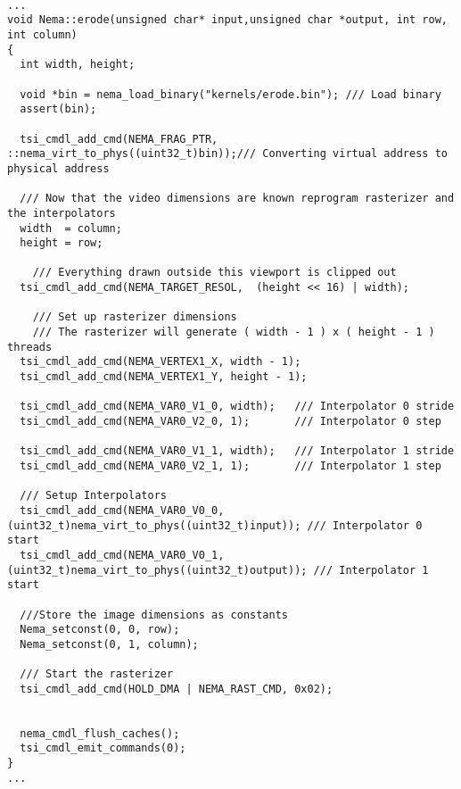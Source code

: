 \lstset {language=C++}
\begin{lstlisting}

...
void Nema::erode(unsigned char* input,unsigned char *output, int row, int column)
{
  int width, height;

  void *bin = nema_load_binary("kernels/erode.bin"); /// Load binary
  assert(bin);

  tsi_cmdl_add_cmd(NEMA_FRAG_PTR, ::nema_virt_to_phys((uint32_t)bin));/// Converting virtual address to physical address

  /// Now that the video dimensions are known reprogram rasterizer and the interpolators
  width  = column;
  height = row;

    /// Everything drawn outside this viewport is clipped out
  tsi_cmdl_add_cmd(NEMA_TARGET_RESOL,  (height << 16) | width);

    /// Set up rasterizer dimensions
    /// The rasterizer will generate ( width - 1 ) x ( height - 1 ) threads
  tsi_cmdl_add_cmd(NEMA_VERTEX1_X, width - 1);
  tsi_cmdl_add_cmd(NEMA_VERTEX1_Y, height - 1);

  tsi_cmdl_add_cmd(NEMA_VAR0_V1_0, width);   /// Interpolator 0 stride
  tsi_cmdl_add_cmd(NEMA_VAR0_V2_0, 1);       /// Interpolator 0 step

  tsi_cmdl_add_cmd(NEMA_VAR0_V1_1, width);   /// Interpolator 1 stride
  tsi_cmdl_add_cmd(NEMA_VAR0_V2_1, 1);       /// Interpolator 1 step

  /// Setup Interpolators
  tsi_cmdl_add_cmd(NEMA_VAR0_V0_0, (uint32_t)nema_virt_to_phys((uint32_t)input)); /// Interpolator 0 start
  tsi_cmdl_add_cmd(NEMA_VAR0_V0_1, (uint32_t)nema_virt_to_phys((uint32_t)output)); /// Interpolator 1 start

  ///Store the image dimensions as constants
  Nema_setconst(0, 0, row);
  Nema_setconst(0, 1, column);

  /// Start the rasterizer
  tsi_cmdl_add_cmd(HOLD_DMA | NEMA_RAST_CMD, 0x02);


  nema_cmdl_flush_caches();
  tsi_cmdl_emit_commands(0);
}
...
\end{lstlisting}
